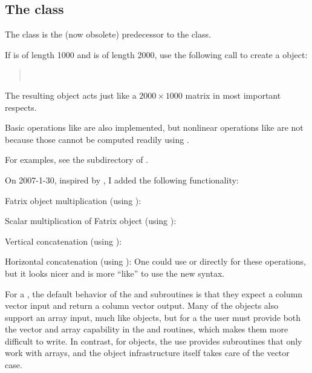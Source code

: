 
\subsection{The \fatrix class}

The \fatrix class
is the (now obsolete) predecessor
to the \fatrixx class.

If \x is of length 1000
and \y is of length 2000,
use the following call
to create a \fatrix object:
\begin{quote}
\\\hspace*{7em}
\end{quote}
The resulting \fatrix object 
acts just like
a $2000 \times 1000$ matrix
in most important respects.


Basic operations
like 
are also implemented,
but nonlinear operations
like 
are not
because those cannot be computed readily
using . 

For examples, see
the  subdirectory of \irt.

On 2007-1-30,
inspired by ,
I added the following functionality:
\blist
\item
Fatrix object multiplication
(using ): 
\item
Scalar multiplication of Fatrix object
(using ): 
\item
Vertical concatenation (using ):
\item
Horizontal concatenation (using ):
\elist
One could use  or 
directly for these operations,
but it looks nicer
and is more ``\matlab like''
to use the new syntax.

For a \fatrix,
the default behavior of the
and
subroutines
is that they expect
a column vector input
and return
a column vector output.
Many of the \fatrix objects
also support an array input,
much like \fatrixx objects,
but for a \fatrix
the user must provide
both the vector and array capability
in the
and
routines,
which makes them more difficult to write.
In contrast,
for \fatrixx objects,
the use provides subroutines
that only work with arrays,
and the \fatrixx object infrastructure itself
takes care of the vector case.
